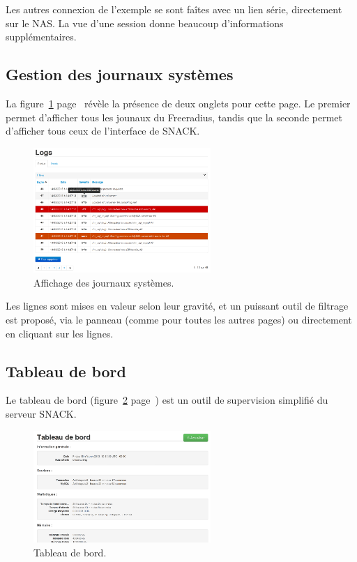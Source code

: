 Les autres connexion de l'exemple se sont faîtes avec un lien série, directement sur le NAS. La vue d'une session donne beaucoup d'informations supplémentaires.

\subsection{Gestion des journaux systèmes}

La figure~\ref{logs} page~\pageref{logs} révèle la présence de deux onglets pour cette page. Le premier permet d'afficher tous les jounaux du Freeradius, tandis que la seconde permet d'afficher tous ceux de l'interface de SNACK.

\begin{figure}[!h]
	\begin{center}
	    \includegraphics[width=0.6\textwidth]{img/logs.png}
	\end{center}
	\caption{Affichage des journaux systèmes.}
	\label{logs}
\end{figure}

Les lignes sont mises en valeur selon leur gravité, et un puissant outil de filtrage est proposé, via le panneau (comme pour toutes les autres pages) ou directement en cliquant sur les lignes.

\subsection{Tableau de bord}

Le tableau de bord (figure~\ref{dashboard} page~\pageref{dashboard}) est un outil de supervision simplifié du serveur SNACK.

\begin{figure}[!h]
	\begin{center}
	    \includegraphics[width=0.6\textwidth]{img/dashboard.png}
	\end{center}
	\caption{Tableau de bord.}
	\label{dashboard}
\end{figure}

